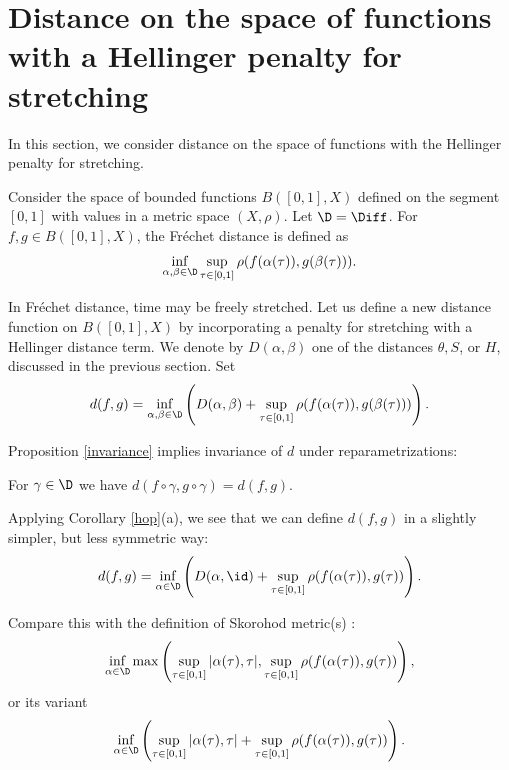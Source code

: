 \documentclass[12pt]{amsart}
\begin{document}
\section{Distance on the space of functions with a Hellinger penalty for stretching}
\label{distance}

In this section, we consider distance on the space of functions with the Hellinger penalty for stretching.

Consider the space of bounded functions $B([0,1], X)$ defined on the segment $[0,1]$ with values in a metric space $(X, \rho)$. Let $\D = \Diff$. For $f, g \in B([0,1], X)$, the Fr\'echet distance is defined as 
\[\inf_{\alpha,\beta\in\D} \sup_{\tau \in [0,1]} \rho(f(\alpha(\tau)), g(\beta(\tau))).\]


In Fr\'echet distance, time may be freely stretched.
Let us define a new distance function on $B([0,1], X)$ by incorporating a penalty for stretching with a  Hellinger distance term. We denote by $D(\alpha, \beta)$ one of the distances $\theta, S$, or $H$, discussed in the previous section. Set
\begin{equation}
\label{metric}
d(f, g) = \inf_{\alpha,\beta\in\D}  \left( D(\alpha, \beta) + \sup_{\tau \in [0,1]} \rho(f(\alpha(\tau)), g(\beta(\tau))) \right).
\end{equation}

Proposition \ref{invariance} implies invariance of $d$ under reparametrizations:
\begin{lemma}
For $\gamma \in \D$ we have $d(f \circ \gamma, g \circ \gamma) = d(f, g)$.
\end{lemma}

Applying Corollary \ref{hop}(a), we see that we can define $d(f,g)$ in a slightly simpler, but less symmetric way:
\[d(f, g) = \inf_{\alpha\in\D}  \left( D(\alpha, \id) + \sup_{\tau \in [0,1]} \rho(f(\alpha(\tau)), g(\tau)) \right).\]

Compare this with the definition of Skorohod metric(s) \cite{B}:
\[\inf_{\alpha\in\D} \max \left(  \sup_{\tau \in [0,1]} |\alpha(\tau), \tau|, \sup_{\tau \in [0,1]} \rho(f(\alpha(\tau)), g(\tau)) \right),\]
or its variant
\[\inf_{\alpha\in\D} \left(  \sup_{\tau \in [0,1]} |\alpha(\tau), \tau| + \sup_{\tau \in [0,1]} \rho(f(\alpha(\tau)), g(\tau)) \right).\]
\end{document}
